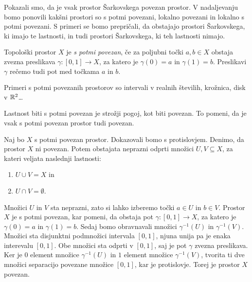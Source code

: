 \documentclass[../TG_magistrsko_delo_sections.tex]{subfiles}
\begin{document}
Pokazali smo, da je vsak prostor Šarkovskega povezan prostor. V nadaljevanju bomo ponovili kakšni prostori so s potmi povezani, lokalno povezani in lokalno s potmi povezani. S primeri se bomo prepričali, da obstajajo prostori Šarkovskega, ki imajo te lastnosti, in tudi prostori Šarkovskega, ki teh lastnosti nimajo.


\begin{definicija}
Topološki prostor $X$ je \emph{s potmi povezan}, če za poljubni točki $a, b \in X$ obstaja zvezna preslikava $\gamma \colon [0, 1] \to X$, za katero je $\gamma(0) = a$ in $\gamma(1) = b$. Preslikavi $\gamma$ rečemo tudi pot med točkama $a$ in $b$.
\end{definicija}

Primeri s potmi povezanih prostorov so intervali v realnih številih, krožnica, disk v $\mathbb R^2$\dots
\begin{trditev}
Lastnost biti s potmi povezan je strožji pogoj, kot biti povezan. To pomeni, da je vsak s potmi povezan prostor tudi povezan.
\end{trditev}

\begin{dokaz}
Naj bo $X$ s potmi povezan prostor. Dokazovali bomo s protislovjem. Denimo, da prostor $X$ ni povezan. Potem obstajata neprazni odprti množici $U, V \subseteq X$, za kateri veljata naslednji lastnosti:
\begin{enumerate}
\item $U \cup V = X$ in 
\item $U \cap V = \emptyset$.
\end{enumerate}
Množici $U$ in $V$ sta neprazni, zato si lahko izberemo točki $a\in U$ in $b\in V$. Prostor $X$ je s potmi povezan, kar pomeni, da obstaja pot $\gamma \colon [0, 1] \to X$, za katero je $\gamma(0) =a$ in $\gamma(1)=b$. Sedaj bomo obravnavali množici $\gamma^{-1}(U)$ in $\gamma^{-1}(V)$. Množici sta disjunktni podmnožici intervala $[0, 1]$, njuna unija pa je enaka interevalu $[0, 1]$. Obe množici sta odprti v $[0, 1]$, saj je pot $\gamma$ zvezna preslikava. Ker je $0$ element množice  $\gamma^{-1}(U)$ in $1$ element množice $\gamma^{-1}(V)$, tvorita ti dve množici separacijo povezane množice $[0, 1]$, kar je protislovje. Torej je prostor $X$ povezan.
\end{dokaz}
\end{document}
